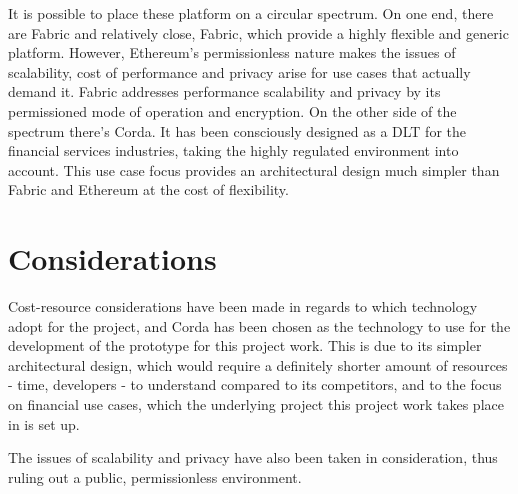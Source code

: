 It is possible to place these platform on a circular spectrum. On one end, there are Fabric and relatively close, Fabric, which provide a highly flexible and generic platform. However, Ethereum's permissionless nature makes the issues of scalability, cost of performance and privacy arise for use cases that actually demand it. Fabric addresses performance scalability and privacy by its permissioned mode of operation and encryption.
On the other side of the spectrum there's Corda. It has been consciously designed as a DLT for the financial services industries, taking the highly regulated environment into account.
This use case focus provides an architectural design much simpler than Fabric and Ethereum at the cost of flexibility.

\section{Considerations}
Cost-resource considerations have been made in regards to which technology adopt for the project, and Corda has been chosen as the technology to use for the development of the prototype for this project work. 
This is due to its simpler architectural design, which would require a definitely shorter amount of resources - time, developers - to understand compared to its competitors, and to the focus on financial use cases, which the underlying project this project work takes place in is set up.

The issues of scalability and privacy have also been taken in consideration, thus ruling out a public, permissionless environment.
